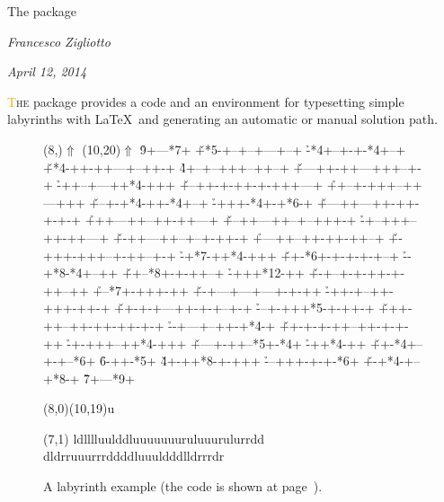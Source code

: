 \documentclass[a4paper,11pt,headinclude,footinclude]{scrartcl}
\def\ins{~}
\def\stmtitle{The \pkgname{labyrinth} package}
\def\stmauthor{Francesco Zigliotto}
\def\stmdate{April 12, 2014}
\begin{document}

\begin{center}
{\LARGE\stmtitle\par\bigskip}
{\Large\color{Orange}\itshape\stmauthor\par\medskip}
{\itshape\stmdate}
\end{center}
\par\smallskip

\thispagestyle{plain}

\lettrine[findent=2pt,nindent=-2pt,loversize=.2,lraise=0]{\textcolor{Orange}{T}}{\lsstyle he}  package provides a code and an environment for typesetting simple labyrinths with \LaTeX\ and generating an automatic or manual solution path.

\tableofcontents

\enlargethispage{2\baselineskip}

\begin{figure}[bh]
\par\bigskip
\begin{labyrinth}[unit=9pt]{19}{20}
\putsymbol(8,){\Large$\Uparrow$}
\putsymbol(10,20){\Large$\Uparrow$}
                        \h *9+---*7+
\v +*5-+--+--+---+--+   \h -*4+--+-+-*4+--+ 
\v +*4-++-++---+--++-+  \h *4+--+--+++--++--+ 
\v +---++-++---+++--+-+ \h -++--+---++*4-+++ 
\v +--++-+-++-+-+++---+ \h ++--+-+++--++---+++ 
\v +--+-+*4-++-*4+--+   \h -+++-*4+-+*6-+ 
\v +---++---++-++-+-+-+ \h +++---++--++-++---+ 
\v +--++---++--+--+++-+ \h -+--+++--++-++---+ 
\v +-++---++--+--+-++-+ \h +---++--++-++-++--+ 
\v +-+++-+++--+-++--+-+ \h -+*7-++*4-+++ 
\v ++-*6+-+-+-+-+--+    \h --+*8-*4+--++ 
\v ++--*8+-+-++--+      \h -+++*{12}-++ 
\v +-+--+-+-++-+-++--++ \h +--*7+-+++-++ 
\v +-+---+---+---+-+-++ \h -++-+--++-+++-++-+ 
\v ++-+-+---++-+-+--+-+ \h ---+-+++*5-+-++-+ 
\v +++-++--++-++-++-+-+ \h --+---+--++-+*4-+ 
\v ++-+-+-++--++-+-+-++ \h -+-+++--++*4-+++ 
\v +---+-++--*5+-*4+    \h -++*4-++ 
\v ++-*4+--+-+--*6+     \h *6-++-*5+ 
\v *4+-++*8-+-+++       \h ---+++-+-+-*6+ 
\v +-+*4-+--+*8-+       \h *7+---*9+

\autosolution[font=\color{Orange}](8,0)(10,19){u}

\labyrinthsolution[
	font=\color{MidnightBlue}\footnotesize,
	up=\kern2pt$\uparrow$,
	left=$\leftarrow$,
	down=\kern2pt$\downarrow$,
	right=$\rightarrow$,
	hcorr=0.1\unitlength,
	vcorr=0.3\unitlength](7,1){%
	ldlllluulddluuuuuuuruluuurulurrdd%
	dldrruuurrrddddluuuldddlldrrrdr}
\end{labyrinth}
\caption{A labyrinth example (the code is shown at page\ins\pageref{sec:Example}).}
\label{fig:Example}
\end{figure}
\end{document}
